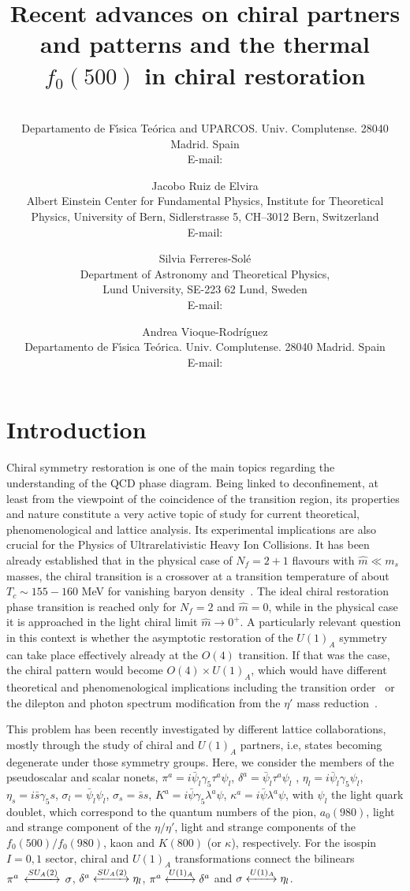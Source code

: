\documentclass{PoS}
\title{Recent advances on chiral partners and patterns and the thermal $f_0(500)$ in chiral restoration}
\author{\speaker{Angel G\'omez Nicola}
\\
        Departamento de F\'{\i}sica
Te\'orica and UPARCOS. Univ. Complutense. 28040 Madrid. Spain\\
        E-mail: \email{gomez@ucm.es}}
\author{Jacobo Ruiz de Elvira\\
        Albert Einstein Center for Fundamental Physics, Institute for Theoretical Physics,
University of Bern, Sidlerstrasse 5, CH--3012 Bern, Switzerland\\
        E-mail: \email{elvira@itp.unibe.ch}}
\author{Silvia Ferreres-Sol\'e\\
     Department of Astronomy and Theoretical Physics,\\
Lund University, SE-223 62 Lund, Sweden
\\
        E-mail: \email{ferreres.sole@gmail.com}}
\author{Andrea Vioque-Rodr\'iguez\\
         Departamento de F\'{\i}sica
Te\'orica. Univ. Complutense. 28040 Madrid. Spain\\
        E-mail: \email{avioque@ucm.es}}
\begin{document}
\section{Introduction}
Chiral symmetry restoration is one of the main topics regarding the understanding of the QCD phase diagram. 
Being linked to deconfinement, at least from the viewpoint of the coincidence of the transition region, its properties and nature constitute a very active topic of study for current theoretical, phenomenological and lattice analysis. 
Its experimental implications are also crucial for the Physics of Ultrarelativistic Heavy Ion Collisions. It has been already established that in the physical case of $N_f=2+1$ flavours with $\hat m\ll m_s$  masses, the chiral transition is a  crossover at a transition temperature of about $T_c\sim 155-160$ MeV for vanishing baryon density~\cite{Aoki:2009sc,Bazavov:2011nk,Buchoff:2013nra}. The ideal chiral restoration phase transition is reached only for $N_f=2$ and $\hat m =0$, while in the physical case it is approached in the light chiral limit $\hat m\rightarrow 0^+$. A particularly relevant question in this context is whether the asymptotic restoration of the $U(1)_A$ symmetry~\cite{Gross:1980br} can take place effectively already at the $O(4)$ transition. If that was the case, the chiral pattern would become $O(4)\times U(1)_A$, which would have different theoretical and phenomenological implications including the transition order~\cite{Pisarski:1983ms} or the dilepton and photon spectrum modification from the $\eta'$ mass reduction~\cite{Kapusta:1995ww,Csorgo:2009pa}. 

This problem has been recently investigated by different lattice collaborations, mostly through the study of chiral and $U(1)_A$ partners, i.e, states becoming degenerate under those symmetry groups. 
Here, we consider the members of the pseudoscalar and scalar nonets,  $\pi^a=i\bar\psi_l\gamma_5\tau^a\psi_l$, $\delta^a=\bar\psi_l \tau^a \psi_l$ , $\eta_l=i\bar\psi_l\gamma_5 \psi_l$, $\eta_s=i\bar s \gamma_5 s$, $\sigma_l=\bar\psi_l \psi_l$, $\sigma_s=\bar s  s$, $K^a=i\bar\psi  \gamma_5 \lambda^a \psi$, $\kappa^a=i\bar\psi  \lambda^a \psi$, with $\psi_l$  the light quark doublet, which correspond to the quantum numbers of the pion, $a_0(980)$, light and strange component of the $\eta/\eta'$, light and strange components of the $f_0(500)/f_0(980)$, kaon and $K(800)$ (or $\kappa$), respectively. 
For the isospin $I=0,1$ sector, chiral and $U(1)_A$ transformations connect the bilinears $\pi^a\,\xleftrightarrow{SU_A(2)}\,\sigma$, $\delta^a\xleftrightarrow{SU_A(2)}\eta_l$, $\pi^a\xleftrightarrow{U(1)_A}\delta^a$ and $\sigma\xleftrightarrow{U(1)_A}\eta_l$.
\end{document}
